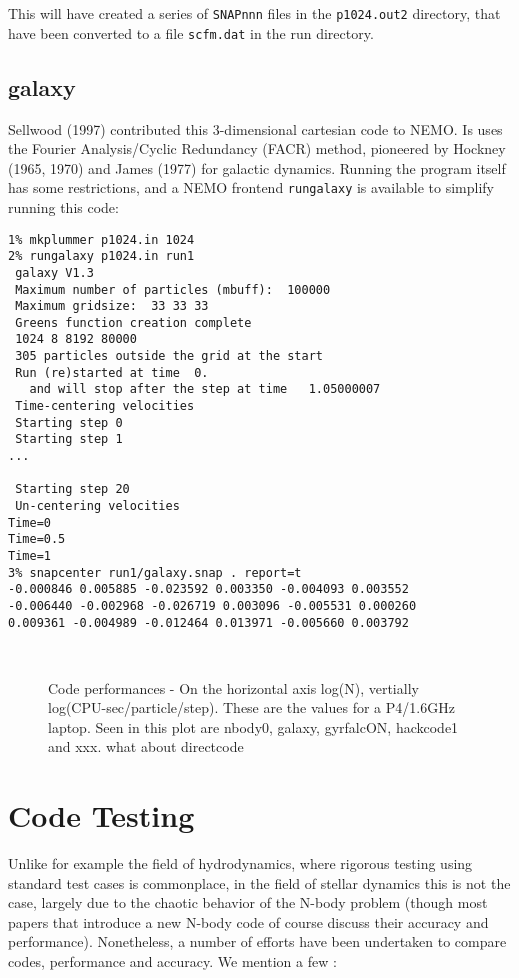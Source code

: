 This will have created a series of {\tt SNAPnnn} files in the {\tt p1024.out2}
directory, that have been converted to a file {\tt scfm.dat} in the 
run directory.

\section{galaxy}

Sellwood (1997) contributed this 3-dimensional cartesian code to NEMO. Is uses the
Fourier Analysis/Cyclic Redundancy (FACR) method, pioneered by
Hockney (1965, 1970) and James (1977) for galactic dynamics. Running
the program itself has some restrictions, and a NEMO frontend {\tt rungalaxy}
is available to simplify running this code:

\footnotesize\begin{verbatim}
1% mkplummer p1024.in 1024
2% rungalaxy p1024.in run1
 galaxy V1.3 
 Maximum number of particles (mbuff):  100000
 Maximum gridsize:  33 33 33
 Greens function creation complete
 1024 8 8192 80000
 305 particles outside the grid at the start
 Run (re)started at time  0.
   and will stop after the step at time   1.05000007
 Time-centering velocities
 Starting step 0
 Starting step 1
...

 Starting step 20
 Un-centering velocities
Time=0
Time=0.5
Time=1
3% snapcenter run1/galaxy.snap . report=t
-0.000846 0.005885 -0.023592 0.003350 -0.004093 0.003552 
-0.006440 -0.002968 -0.026719 0.003096 -0.005531 0.000260 
0.009361 -0.004989 -0.012464 0.013971 -0.005660 0.003792 



\end{verbatim}\normalsize

\begin{figure}[htb]
\caption[Code Performances]
{Code performances - On the horizontal axis log(N), vertially log(CPU-sec/particle/step).
These are the values for a P4/1.6GHz laptop. Seen in this plot
are nbody0, galaxy, gyrfalcON, hackcode1 and xxx. what about directcode}
\end{figure}


\chapter                {Code Testing}

Unlike for example the field of hydrodynamics, where rigorous testing using standard
test cases is commonplace, 
in the field of stellar dynamics this is not the case, largely due to
the chaotic behavior of the N-body problem 
(though
most papers that introduce a new N-body code of course discuss
their accuracy and performance).
Nonetheless, a
number of efforts have been undertaken to compare codes, performance and
accuracy. We mention a few :


